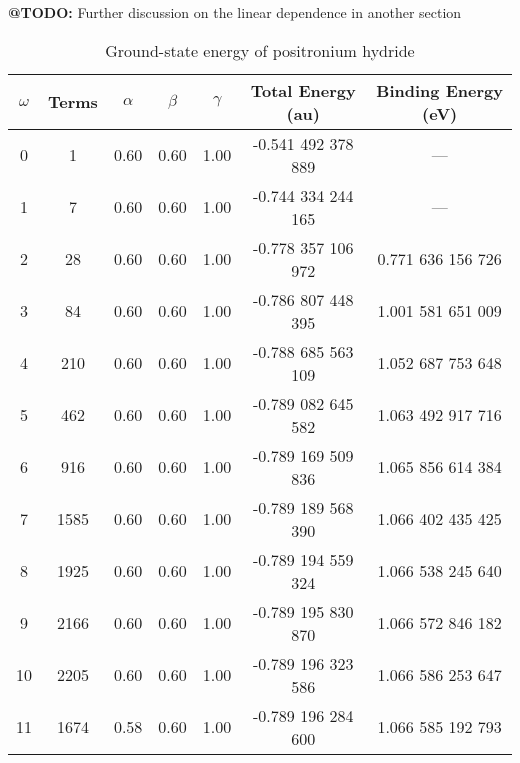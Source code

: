 \documentclass[Dissertation.tex]{subfiles}
\begin{document}
\textbf{@TODO:} Further discussion on the linear dependence in another section


\setlength{\abovecaptionskip}{6pt}   %
\setlength{\belowcaptionskip}{6pt}   %
\begin{table}[H]
\centering
\begin{tabular}{c c c c c c c}
\toprule
$\omega$ & Terms & $\alpha$ & $\beta$ & $\gamma$ & Total Energy (au) & Binding Energy (eV) \\ [0.5ex]
\midrule
0 & 1 & 0.60 & 0.60 & 1.00 & -0.541 492 378 889 & --- \\
1 & 7 & 0.60 & 0.60 & 1.00 & -0.744 334 244 165 & --- \\
2 & 28 & 0.60 & 0.60 & 1.00 & -0.778 357 106 972 & 0.771 636 156 726 \\
3 & 84 & 0.60 & 0.60 & 1.00 & -0.786 807 448 395 & 1.001 581 651 009 \\
4 & 210 & 0.60 & 0.60 & 1.00 & -0.788 685 563 109 & 1.052 687 753 648 \\
5 & 462 & 0.60 & 0.60 & 1.00 & -0.789 082 645 582 & 1.063 492 917 716 \\
6 & 916 & 0.60 & 0.60 & 1.00 & -0.789 169 509 836 & 1.065 856 614 384 \\
7 & 1585 & 0.60 & 0.60 & 1.00 & -0.789 189 568 390 & 1.066 402 435 425 \\
8 & 1925 & 0.60 & 0.60 & 1.00 & -0.789 194 559 324 & 1.066 538 245 640 \\
9 & 2166 & 0.60 & 0.60 & 1.00 & -0.789 195 830 870 & 1.066 572 846 182 \\
10 & 2205 & 0.60 & 0.60 & 1.00 & -0.789 196 323 586 & 1.066 586 253 647 \\
11 & 1674 & 0.58 & 0.60 & 1.00 & -0.789 196 284 600 & 1.066 585 192 793 \\
\bottomrule
\end{tabular}
\caption{Ground-state energy of positronium hydride} %
\label{tab:BoundEnergy}
\end{table}
\end{document}
